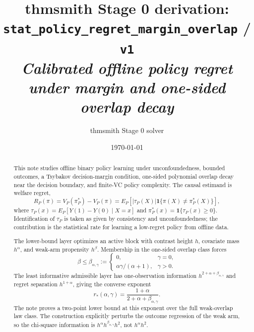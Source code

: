 \documentclass[11pt]{article}
\title{thmsmith Stage 0 derivation: \texttt{stat\_policy\_regret\_margin\_overlap} / \texttt{v1}%
  \\ \large\textit{Calibrated offline policy regret under margin and one-sided overlap decay}}
\author{thmsmith Stage 0 solver}
\date{\today}
\newcommand{\one}{\mathbf{1}}
\theoremstyle{definition}
\theoremstyle{plain}
\theoremstyle{remark}
\begin{document}
\maketitle


\begin{abstract}
This note studies offline binary policy learning under unconfoundedness,
bounded outcomes, a Tsybakov decision-margin condition, one-sided polynomial
overlap decay near the decision boundary, and finite-VC policy complexity.
The causal estimand is welfare regret,
\[
R_P(\pi)=V_P(\pi_P^*)-V_P(\pi)
      =E_P[|\tau_P(X)|\one\{\pi(X)\ne\pi_P^*(X)\}],
\]
where \(\tau_P(x)=E_P[Y(1)-Y(0)\mid X=x]\) and
\(\pi_P^*(x)=\one\{\tau_P(x)\ge0\}\).  Identification of \(\tau_P\) is taken
as given by consistency and unconfoundedness; the contribution is the
statistical rate for learning a low-regret policy from offline data.

The lower-bound layer optimizes an active block with contrast height \(h\),
covariate mass \(h^\alpha\), and weak-arm propensity \(h^\beta\).  Membership
in the one-sided overlap class forces
\[
\beta\le \beta_{\alpha,\gamma}:=
\begin{cases}
0, & \gamma=0,\\
\alpha\gamma/(\alpha+1), & \gamma>0.
\end{cases}
\]
The least informative admissible layer has one-observation information
\(h^{2+\alpha+\beta_{\alpha,\gamma}}\) and regret separation
\(h^{1+\alpha}\), giving the converse exponent
\[
r_*(\alpha,\gamma)=
\frac{1+\alpha}{2+\alpha+\beta_{\alpha,\gamma}}.
\]
The note proves a two-point lower bound at this exponent over the full
weak-overlap law class.  The construction explicitly perturbs the outcome
regression of the weak arm, so the chi-square information is
\(h^\alpha h^{\beta_{\alpha,\gamma}}h^2\), not \(h^\alpha h^2\).


\end{abstract}
\end{document}
